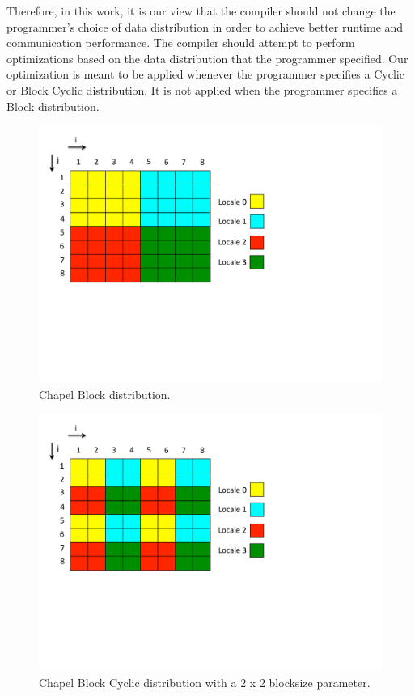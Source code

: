 Therefore, in this work, it is our view that the compiler should not change the programmer's choice of data distribution in order to achieve better runtime and communication performance. The compiler should attempt to perform optimizations based on the data distribution that the programmer specified. Our optimization is meant to be applied whenever the programmer specifies a Cyclic or Block Cyclic distribution. It is not applied when the programmer specifies a Block distribution.

\begin{figure}
	\begin{center}
	\includegraphics[scale=0.55]{./Figures/block_dist}
	\caption{Chapel Block distribution.}
	\label{block_dist}
	\end{center}
\end{figure}

\begin{figure}
	\begin{center}
	\includegraphics[scale=0.55]{./Figures/block_cyc_dist}
	\caption{Chapel Block Cyclic distribution with a 2 x 2 blocksize parameter.}
	\label{block_cyc_dist}
	\end{center}
\end{figure}

